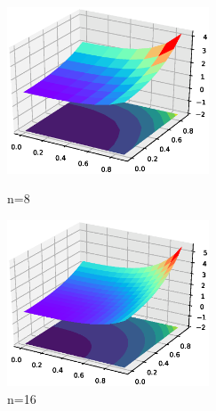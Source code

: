 \documentclass[12]{article}%
\begin{document}
\begin{figure}[H]
    \centering
    \begin{minipage}[t]{0.48\textwidth}
    \centering
    \includegraphics[width=6cm]{../pic/fun38.eps}
    \caption{n=8}
    \end{minipage}
    \begin{minipage}[t]{0.48\textwidth}
    \centering
    \includegraphics[width=6cm]{../pic/fun316.eps}
    \caption{n=16}
    \end{minipage}
\end{figure}
\end{document}
